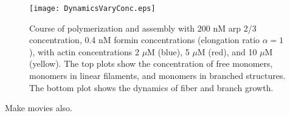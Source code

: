 \documentclass[11pt]{article}
\begin{document}
\begin{figure}
\centering
\texttt{[image: DynamicsVaryConc.eps]}
\caption{\label{fig:ActinConc}Course of polymerization and assembly with 200 nM arp 2/3 concentration, 0.4 nM formin concentrations (elongation ratio $\alpha=1$), with actin concentrations 2 $\mu$M (blue), 5 $\mu$M (red), and 10 $\mu$M (yellow). The top plots show the concentration of free monomers, monomers in linear filaments, and monomers in branched structures. The bottom plot shows the dynamics of fiber and branch growth. }
\end{figure}
Make movies also.






\end{document}
